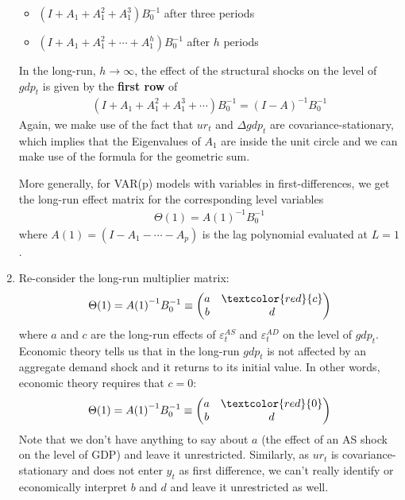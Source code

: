 \begin{enumerate}
\begin{itemize}
\item \((I+A_{1}+A_{1}^{2}+A_{1}^{3}) B_{0}^{-1}\) after three periods
\item \((I+A_{1}+A_{1}^{2}+\cdots +A_{1}^{h}) B_{0}^{-1}\) after \(h\) periods
\end{itemize}
In the long-run, \(h\rightarrow\infty \), the effect of the structural shocks on the level of \({gdp}_{t}\) is given by the \textbf{first row} of
\begin{align*}
(I+A_{1}+A_{1}^{2}+A_{1}^{3}+\cdots ) B_{0}^{-1} = {(I-A)}^{-1} B_{0}^{-1}
\end{align*}
Again, we make use of the fact that \({ur}_{t}\) and \(\Delta {gdp}_{t}\) are covariance-stationary,
  which implies that the Eigenvalues of \(A_{1}\) are inside the unit circle and we can make use of the formula for the geometric sum.

More generally, for VAR{(p)} models with variables in first-differences, we get the long-run effect matrix for the corresponding level variables
\begin{align*}
\Theta(1) = {A(1)}^{-1} B_{0}^{-1}
\end{align*}
where \(A(1)= (I - A_{1} - \cdots  - A_{p})\) is the lag polynomial evaluated at \(L=1\).

\item Re-consider the long-run multiplier matrix:
\begin{align*}
\Theta(1) = {A(1)}^{-1} B_{0}^{-1} \equiv \begin{pmatrix} a & \textcolor{red}{c}\\ b & d \end{pmatrix}
\end{align*}
where \(a\) and \(c\) are the long-run effects of \(\varepsilon_{t}^{AS}\) and \(\varepsilon_{t}^{AD}\) on the level of \({gdp}_{t}\).
Economic theory tells us that in the long-run \({gdp}_{t}\) is not affected by an aggregate demand shock and it returns to its initial value.
In other words, economic theory requires that \(c=0\):
\begin{align*}
\Theta(1) = {A(1)}^{-1} B_{0}^{-1} \equiv \begin{pmatrix} a & \textcolor{red}{0}\\ b & d \end{pmatrix}
\end{align*}
Note that we don't have anything to say about \(a\) (the effect of an AS shock on the level of GDP) and leave it unrestricted.
Similarly, as \({ur}_{t}\) is covariance-stationary and does not enter \(y_{t}\) as first difference,
  we can't really identify or economically interpret \(b\) and \(d\) and leave it unrestricted as well.


\end{enumerate}
